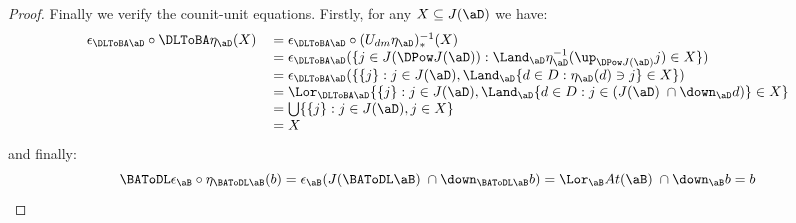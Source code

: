 \documentclass{article}
\begin{document}
\begin{proof}
Finally we verify the counit-unit equations. Firstly, for any $X \subseteq J(\aD)$ we have:
\[
\begin{tabular}{lll}
$\epsilon_{\DLToBA \aD} \circ \DLToBA \eta_\aD (X)$
&
$= \epsilon_{\DLToBA \aD} \circ (U_{dm} \eta_\aD)_*^{-1}(X)$
\\&
$= \epsilon_{\DLToBA \aD}(\{ j \in J(\DPow J(\aD)) : \Land_\aD \eta_\aD^{-1}(\up_{\DPow J(\aD)} j) \in X \})$
\\&
$= \epsilon_{\DLToBA \aD}(\{ \{j\} : j \in J(\aD), \Land_\aD \{ d \in D : \eta_\aD(d) \ni j\} \in X  \})$
\\&
$= \Lor_{\DLToBA\aD} \{ \{j\} : j \in J(\aD), \Land_\aD \{ d \in D : j \in  (J(\aD) \; \cap \down_\aD d)  \} \in X  \}$
\\&
$= \bigcup \{ \{j\} : j \in J(\aD), j \in X  \}$
\\&
$= X$
\end{tabular}
\]
and finally:
\[
\BAToDL \epsilon_\aB \circ \eta_{\BAToDL \aB} (b)
= \epsilon_\aB (J(\BAToDL \aB)\;\cap \down_{\BAToDL\aB} b)
= \Lor_\aB At(\aB)\;\cap \down_\aB b
= b
\]
\end{proof}



\end{document}
